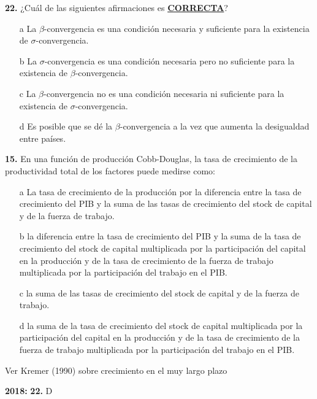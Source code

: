 \documentclass{nuevotema}
\begin{document}
\preguntas


\textbf{22.} ¿Cuál de las siguientes afirmaciones es \underline{\textbf{CORRECTA}}?

\begin{itemize}
	\item[a] La $\beta$-convergencia es una condición necesaria y suficiente para la existencia de $\sigma$-convergencia.
	\item[b] La $\sigma$-convergencia es una condición necesaria pero no suficiente para la existencia de $\beta$-convergencia.
	\item[c] La $\beta$-convergencia no es una condición necesaria ni suficiente para la existencia de $\sigma$-convergencia.
	\item[d] Es posible que se dé la $\beta$-convergencia a la vez que aumenta la desigualdad entre países. 
\end{itemize}




\textbf{15.} En una función de producción Cobb-Douglas, la tasa de crecimiento de la productividad total de los factores puede medirse como:

\begin{itemize}
	\item[a] La tasa de crecimiento de la producción por la diferencia entre la tasa de crecimiento del PIB y la suma de las tasas de crecimiento del stock de capital y de la fuerza de trabajo.
	\item[b] la diferencia entre la tasa de crecimiento del PIB y la suma de la tasa de crecimiento del stock de capital multiplicada por la participación del capital en la producción y de la tasa de crecimiento de la fuerza de trabajo multiplicada por la participación del trabajo en el PIB.
	\item[c] la suma de las tasas de crecimiento del stock de capital y de la fuerza de trabajo.
	\item[d] la suma de la tasa de crecimiento del stock de capital multiplicada por la participación del capital en la producción y de la tasa de crecimiento de la fuerza de trabajo multiplicada por la participación del trabajo en el PIB.
\end{itemize}

\notas

Ver Kremer (1990) sobre crecimiento en el muy largo plazo

\textbf{2018:} \textbf{22.} D
\end{document}

